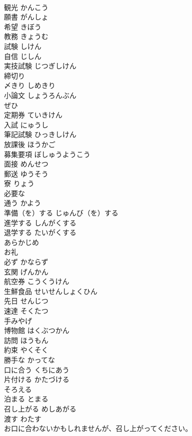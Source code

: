 \documentclass[8pt]{extreport}
\begin{document}
\begin{CJK}{UTF8}{min}
\\	観光	かんこう	
\\	願書	がんしょ	
\\	希望	きぼう	
\\	教務	きょうむ	
\\	試験	しけん	
\\	自信	じしん	
\\	実技試験	じつぎしけん	
\\	締切り
\\	〆きり	しめきり	
\\	小論文	しょうろんぶん	
\\	ぜひ		
\\	定期券	ていきけん	
\\	入試	にゅうし	
\\	筆記試験	ひっきしけん	
\\	放課後	ほうかご	
\\	募集要項	ぼしゅうようこう	
\\	面接	めんせつ	
\\	郵送	ゆうそう	
\\	寮	りょう	
\\	必要な		
\\	通う	かよう	
\\	準備（を）する	じゅんび（を）する	
\\	進学する	しんがくする	
\\	退学する	たいがくする	
\\	あらかじめ		
\\	お礼		
\\	必ず	かならず	
\\	玄関	げんかん	
\\	航空券	こうくうけん	
\\	生鮮食品	せいせんしょくひん	
\\	先日	せんじつ	
\\	速達	そくたつ	
\\	手みやげ		
\\	博物館	はくぶつかん	
\\	訪問	ほうもん	
\\	約束	やくそく	
\\	勝手な	かってな	
\\	口に合う	くちにあう	
\\	片付ける	かたづける	
\\	そろえる		
\\	泊まる	とまる	
\\	召し上がる	めしあがる	
\\	渡す	わたす	
\\	お口に合わないかもしれませんが、召し上がってください。		

\end{CJK}
\end{document}
